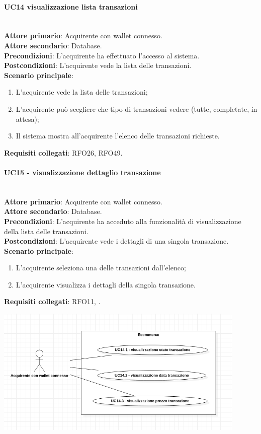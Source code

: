 \documentclass[a4paper, 12pt]{article}
\begin{document}
\paragraph{UC14 visualizzazione lista transazioni}\\
\textbf{Attore primario}: Acquirente con wallet connesso. \\
\textbf{Attore secondario}: Database. \\
\textbf{Precondizioni}: L'acquirente ha effettuato l'accesso al sistema.\\
\textbf{Postcondizioni}:  L'acquirente vede la lista delle transazioni.\\
\textbf{Scenario principale}:
\begin{enumerate}
\item L'acquirente vede la lista delle transazioni;
\item L'acquirente può scegliere che tipo di transazioni vedere (tutte, completate, in attesa);
\item Il sistema mostra all'acquirente l'elenco delle transazioni richieste.
\end{enumerate}
\textbf{Requisiti collegati}: RFO26, RFO49.

\paragraph{UC15 - visualizzazione dettaglio transazione}\\
\textbf{Attore primario}: Acquirente con wallet connesso.\\
\textbf{Attore secondario}: Database.\\
\textbf{Precondizioni}: L'acquirente ha acceduto alla funzionalità di visualizzazione della lista delle transazioni.\\
\textbf{Postcondizioni}: L'acquirente vede i dettagli di una singola transazione.\\
\textbf{Scenario principale}:
\begin{enumerate}
\item L'acquirente seleziona una delle transazioni dall'elenco;
\item L'acquirente visualizza i dettagli della singola transazione.
\end{enumerate}
\textbf{Requisiti collegati}: RFO11, .

\includegraphics[width=0.9\textwidth]{UC14D}
\end{document}
